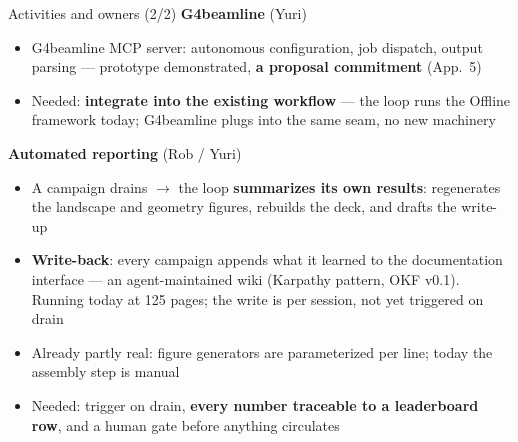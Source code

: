 \documentclass[aspectratio=169,10pt]{beamer}
\begin{document}
\begin{frame}{Activities and owners (2/2)}
\textbf{G4beamline} \hfill \textcolor{fnalblue}{(Yuri)}
\begin{itemize}\tiny
  \item G4beamline MCP server: autonomous configuration, job dispatch, output parsing --- prototype demonstrated, \textbf{a proposal commitment} (App.\ 5)
  \item Needed: \textbf{integrate into the existing workflow} --- the loop runs the Offline framework today; G4beamline plugs into the same seam, no new machinery
\end{itemize}
\vspace{0.15em}

\textbf{Automated reporting} \hfill \textcolor{fnalblue}{(Rob / Yuri)}
\begin{itemize}\tiny
  \item A campaign drains $\rightarrow$ the loop \textbf{summarizes its own results}: regenerates the landscape and geometry figures, rebuilds the deck, and drafts the write-up
  \item \textbf{Write-back}: every campaign appends what it learned to the documentation interface --- an agent-maintained wiki (Karpathy pattern, OKF v0.1). Running today at 125 pages; the write is per session, not yet triggered on drain
  \item Already partly real: figure generators are parameterized per line; today the assembly step is manual
  \item Needed: trigger on drain, \textbf{every number traceable to a leaderboard row}, and a human gate before anything circulates
\end{itemize}

\end{frame}
\end{document}
